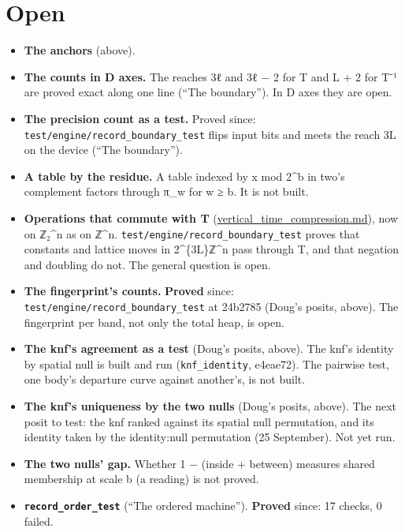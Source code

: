 \section{\texorpdfstring{Open}{Open}}

\begin{itemize}
\item \textbf{The anchors} (above).
\item \textbf{The counts in D axes.} The reaches 3ℓ and 3ℓ − 2 for T and L + 2 for T⁻¹ are proved exact along one line (“The boundary”). In D axes they are open.
\item \textbf{The precision count as a test.} Proved since: \texttt{test/\allowbreak{}engine/\allowbreak{}record\_\allowbreak{}boundary\_\allowbreak{}test} flips input bits and meets the reach 3L on the device (“The boundary”).
\item \textbf{A table by the residue.} A table indexed by x mod 2\textasciicircum{}b in two's complement factors through π\_\allowbreak{}w for w ≥ b. It is not built.
\item \textbf{Operations that commute with T} (\hyperref[chap:vertical-time-compression]{vertical\_\allowbreak{}time\_\allowbreak{}compression.md}), now on ℤ₂\textasciicircum{}n as on ℤ\textasciicircum{}n. \texttt{test/\allowbreak{}engine/\allowbreak{}record\_\allowbreak{}boundary\_\allowbreak{}test} proves that constants and lattice moves in 2\textasciicircum{}\{3L\}ℤ\textasciicircum{}n pass through T, and that negation and doubling do not. The general question is open.
\item \textbf{The fingerprint's counts.} \textbf{Proved} since: \texttt{test/\allowbreak{}engine/\allowbreak{}record\_\allowbreak{}boundary\_\allowbreak{}test} at 24b2785 (Doug's posits, above). The fingerprint per band, not only the total heap, is open.
\item \textbf{The knf's agreement as a test} (Doug's posits, above). The knf's identity by spatial null is built and run (\texttt{knf\_\allowbreak{}identity}, e4eae72). The pairwise test, one body's departure curve against another's, is not built.
\item \textbf{The knf's uniqueness by the two nulls} (Doug's posits, above). The next posit to test: the knf ranked against its spatial null permutation, and its identity taken by the identity:null permutation (25 September). Not yet run.
\item \textbf{The two nulls' gap.} Whether 1 − (inside + between) measures shared membership at scale b (a reading) is not proved.
\item \textbf{\texttt{record\_\allowbreak{}order\_\allowbreak{}test}} (“The ordered machine”). \textbf{Proved} since: 17 checks, 0 failed.

\end{itemize}
